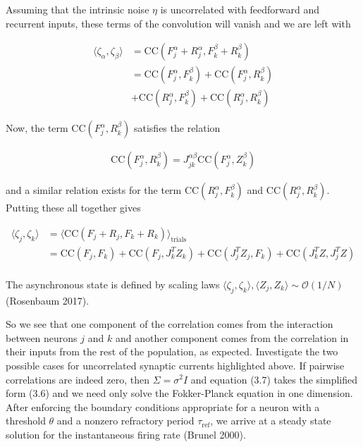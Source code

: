 \documentclass{ucetd}
\begin{document}
Assuming that the intrinsic noise $\eta$ is uncorrelated with feedforward and recurrent inputs, these terms of the convolution will vanish and we are left with 

\begin{align*}
\langle \zeta_{\alpha}, \zeta_{\beta}\rangle &= \mathrm{CC}(F_{j}^{\alpha} + R_{j}^{\alpha},F_{k}^{\beta} + R_{k}^{\beta})\\
&= \mathrm{CC}(F_{j}^{\alpha},F_{k}^{\beta}) + \mathrm{CC}(F_{j}^{\alpha},R_{k}^{\beta})\\
&+ \mathrm{CC}(R_{j}^{\alpha},F_{k}^{\beta}) + \mathrm{CC}(R_{j}^{\alpha},R_{k}^{\beta})
\end{align*}

Now, the term $\mathrm{CC}(F_{j}^{\alpha},R_{k}^{\beta})$ satisfies the relation

\begin{align*}
\mathrm{CC}(F_{j}^{\alpha},R_{k}^{\beta}) = J^{\alpha\beta}_{jk}\mathrm{CC}(F_{j}^{\alpha},Z_{k}^{\beta})
\end{align*}

and a similar relation exists for the term $\mathrm{CC}(R_{j}^{\alpha},F_{k}^{\beta})$ and $\mathrm{CC}(R_{j}^{\alpha},R_{k}^{\beta})$. Putting these all together gives

\begin{align*}
\langle \zeta_{j}, \zeta_{k}\rangle &= \langle\mathrm{CC}(F_{j} + R_{j},F_{k} + R_{k})\rangle_{\mathrm{trials}}\\
&= \mathrm{CC}(F_{j},F_{k}) + \mathrm{CC}(F_{j},J_{k}^{T}Z_{k}) + \mathrm{CC}(J_{j}^{T} Z_{j}, F_{k}) + \mathrm{CC}(J_{k}^{T}Z, J_{j}^{T}Z) \\
\end{align*}

The asynchronous state is defined by scaling laws $\langle \zeta_{j}, \zeta_{k}\rangle, \langle Z_{j}, Z_{k}\rangle \sim \mathcal{O}(1/N)$ (Rosenbaum 2017).


So we see that one component of the correlation comes from the interaction between neurons $j$ and $k$ and another component comes from the correlation in their inputs from the rest of the population, as expected. Investigate the two possible cases for uncorrelated synaptic currents highlighted above. If pairwise correlations are indeed zero, then $\Sigma = \sigma^{2}I$ and equation (3.7) takes the simplified form (3.6) and we need only solve the Fokker-Planck equation in one dimension. After enforcing the boundary conditions appropriate for a neuron with a threshold $\theta$ and a nonzero refractory period $\tau_{\mathrm{ref}}$, we arrive at a steady state solution for the instantaneous firing rate (Brunel 2000). 
\end{document}
